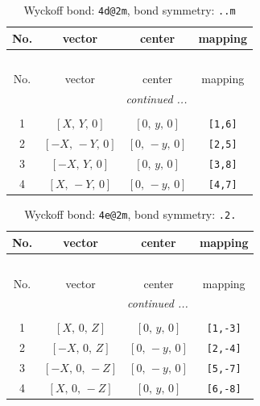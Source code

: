 \documentclass[fleqn,8pt]{jsarticle}
\begin{document}
\begin{longtable}{cccc}
\caption{Wyckoff bond: {\tt 4d@2m}, bond symmetry: {\tt ..m}}
 \\
 \hline \hline
No. & vector & center & mapping \\ \hline \endfirsthead

\multicolumn{3}{l}{\tablename\ \thetable{}} \\
 \hline \hline
No. & vector & center & mapping \\ \hline \endhead

 \hline \hline
\multicolumn{3}{r}{\footnotesize\it continued ...} \\ \endfoot

 \hline \hline
\multicolumn{3}{r}{} \\ \endlastfoot

1 & $\left[ X,\, Y,\, 0 \right]$ & $\left[ 0,\, y,\, 0 \right]$ & {\tt [1,6]} \\ \hline
2 & $\left[ - X,\, - Y,\, 0 \right]$ & $\left[ 0,\, - y,\, 0 \right]$ & {\tt [2,5]} \\ \hline
3 & $\left[ - X,\, Y,\, 0 \right]$ & $\left[ 0,\, y,\, 0 \right]$ & {\tt [3,8]} \\ \hline
4 & $\left[ X,\, - Y,\, 0 \right]$ & $\left[ 0,\, - y,\, 0 \right]$ & {\tt [4,7]} \\
\end{longtable}
\renewcommand{\arraystretch}{1.2}
\begin{longtable}{cccc}
\caption{Wyckoff bond: {\tt 4e@2m}, bond symmetry: {\tt .2.}}
 \\
 \hline \hline
No. & vector & center & mapping \\ \hline \endfirsthead

\multicolumn{3}{l}{\tablename\ \thetable{}} \\
 \hline \hline
No. & vector & center & mapping \\ \hline \endhead

 \hline \hline
\multicolumn{3}{r}{\footnotesize\it continued ...} \\ \endfoot

 \hline \hline
\multicolumn{3}{r}{} \\ \endlastfoot

1 & $\left[ X,\, 0,\, Z \right]$ & $\left[ 0,\, y,\, 0 \right]$ & {\tt [1,-3]} \\ \hline
2 & $\left[ - X,\, 0,\, Z \right]$ & $\left[ 0,\, - y,\, 0 \right]$ & {\tt [2,-4]} \\ \hline
3 & $\left[ - X,\, 0,\, - Z \right]$ & $\left[ 0,\, - y,\, 0 \right]$ & {\tt [5,-7]} \\ \hline
4 & $\left[ X,\, 0,\, - Z \right]$ & $\left[ 0,\, y,\, 0 \right]$ & {\tt [6,-8]} \\
\end{longtable}
\end{document}
